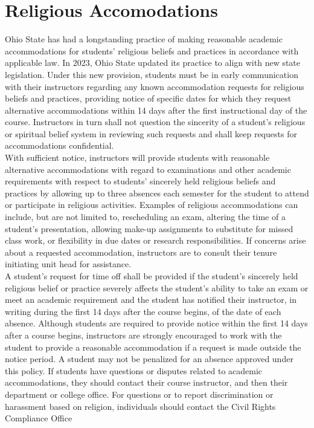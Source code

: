 \documentclass{ximera}
\begin{document}
\section*{Religious Accomodations}
Ohio State has had a longstanding practice of making reasonable academic accommodations for students' religious beliefs and practices in accordance with applicable law. In 2023, Ohio State updated its practice to align with new state legislation. Under this new provision, students must be in early communication with their instructors regarding any known accommodation requests for religious beliefs and practices, providing notice of specific dates for which they request alternative accommodations within 14 days after the first instructional day of the course. Instructors in turn shall not question the sincerity of a student's religious or spiritual belief system in reviewing such requests and shall keep requests for accommodations confidential.\\
With sufficient notice, instructors will provide students with reasonable alternative accommodations with regard to examinations and other academic requirements with respect to students' sincerely held religious beliefs and practices by allowing up to three absences each semester for the student to attend or participate in religious activities. Examples of religious accommodations can include, but are not limited to, rescheduling an exam, altering the time of a student's presentation, allowing make-up assignments to substitute for missed class work, or flexibility in due dates or research responsibilities. If concerns arise about a requested accommodation, instructors are to consult their tenure initiating unit head for assistance.\\
A student's request for time off shall be provided if the student's sincerely held religious belief or practice severely affects the student's ability to take an exam or meet an academic requirement and the student has notified their instructor, in writing during the first 14 days after the course begins, of the date of each absence. Although students are required to provide notice within the first 14 days after a course begins, instructors are strongly encouraged to work with the student to provide a reasonable accommodation if a request is made outside the notice period. A student may not be penalized for an absence approved under this policy. If students have questions or disputes related to academic accommodations, they should contact their course instructor, and then their department or college office. For questions or to report discrimination or harassment based on religion, individuals should contact the Civil Rights Compliance Office
\end{document}
